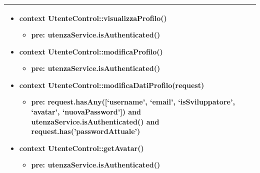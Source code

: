 \begin{tabular}{|| l | p{28em} ||}
\begin{itemize}
	    \item \textbf{context} UtenteControl::visualizzaProfilo() 
		\begin{itemize}
			\item[ ] \textbf{pre:} utenzaService.isAuthenticated()
		\end{itemize} 
	  
	    \item \textbf{context} UtenteControl::modificaProfilo() 
		\begin{itemize}
			\item[ ] \textbf{pre:} utenzaService.isAuthenticated()
		\end{itemize} 

		\item \textbf{context} UtenteControl::modificaDatiProfilo(request) 
	\begin{itemize}
		\item[ ] \textbf{pre:} request.hasAny([‘username’, ‘email’, ‘isSviluppatore’, ‘avatar’, ‘nuovaPassword’]) and utenzaService.isAuthenticated() and request.has('passwordAttuale')
	\end{itemize}

	\item \textbf{context} UtenteControl::getAvatar() 
	\begin{itemize}
		\item[ ] \textbf{pre:} utenzaService.isAuthenticated()
	\end{itemize} 
	\end{itemize}\\
	\hline
\end{tabular}

\newpage
